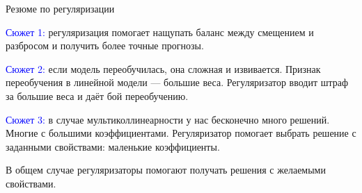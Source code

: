 \documentclass[notes,12pt, aspectratio=169]{beamer}
\newenvironment{wideitemize}{\itemize\addtolength{\itemsep}{10pt}}{\enditemize}
\begin{document}
\begin{frame}{Резюме по регуляризации}
	\begin{wideitemize}
		
		\item  \textcolor{blue}{Сюжет 1:} регуляризация помогает нащупать баланс между смещением и разбросом и получить  более точные прогнозы. 
		
		\item \textcolor{blue}{Сюжет 2:} если модель переобучилась, она сложная и извивается. Признак переобучения в линейной модели — большие веса. Регуляризатор вводит штраф за большие веса и даёт бой переобучению.
		
		\item \textcolor{blue}{Сюжет 3:} в случае мультиколлинеарности у нас бесконечно много решений. Многие с большими коэффициентами. Регуляризатор помогает выбрать решение \alert{с заданными свойствами:} маленькие коэффициенты. 
		
		\item В общем случае регуляризаторы помогают получать решения с желаемыми свойствами.
		
	\end{wideitemize}
\end{frame}
\end{document}
